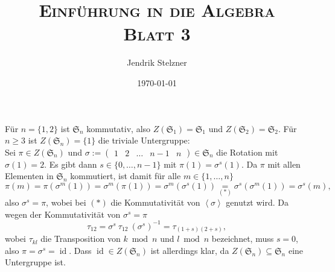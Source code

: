 \documentclass[a4paper,10pt]{article}
\title{\textsc{Einführung in die Algebra \\ \Large Blatt 3}}
\author{Jendrik Stelzner}
\date{\today}
\theoremstyle{definition}
\newcommand{\Sn}{\mathfrak{S}}
\newcommand{\id}{\operatorname{id}}
\newcommand{\vect}[1]{\begin{pmatrix}#1\end{pmatrix}}
\newcommand{\gen}[1]{\left\langle#1\right\rangle}
\begin{document}
\maketitle





\section{}
Für $n = \{1,2\}$ ist $\Sn_n$ kommutativ, also $Z(\Sn_1) = \Sn_1$ und $Z(\Sn_2) = \Sn_2$. Für $n \geq 3$ ist $Z(\Sn_n) = \{1\}$ die triviale Untergruppe:\\
Sei $\pi \in Z(\Sn_n)$ und $\sigma := \vect{1&2&\ldots&n-1&n} \in \Sn_n$ die Rotation mit $\sigma(1)=2$. Es gibt dann $s \in \{0,\ldots,n-1\}$ mit $\pi(1) = \sigma^s(1)$. Da $\pi$ mit allen Elementen in $\Sn_n$ kommutiert, ist damit für alle $m \in \{1,\ldots,n\}$
\[
 \pi(m)
 = \pi(\sigma^m(1))
 = \sigma^m(\pi(1))
 = \sigma^m(\sigma^s(1))
 \underset{(*)}{=} \sigma^s(\sigma^m(1))
 = \sigma^s(m),
\]
also $\sigma^s = \pi$, wobei bei $(*)$ die Kommutativität von $\gen{\sigma}$ genutzt wird. Da wegen der Kommutativität von $\sigma^s = \pi$
\[
 \tau_{12} = \sigma^s\ \tau_{12}\ (\sigma^s)^{-1} = \tau_{(1+s)(2+s)},
\]
wobei $\tau_{kl}$ die Transposition von $k \bmod n$ und $l \bmod n$ bezeichnet, muss $s = 0$, also $\pi = \sigma^s = \id$. Dass $\id \in Z(\Sn_n)$ ist allerdings klar, da $Z(\Sn_n) \subseteq \Sn_n$ eine Untergruppe ist.
\end{document}

